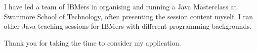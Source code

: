 \documentclass[10pt,stdletter,dateno,sigleft]{newlfm} %
\begin{document}
\begin{newlfm}
I have led a team of IBMers in organising and running a Java Masterclass
at Swanmore School of Technology, often presenting the session content myself.
I ran other Java teaching sessions for IBMers with different programming
backgrounds.



 

Thank you for taking the time to consider my application.


\end{newlfm}
\end{document}
